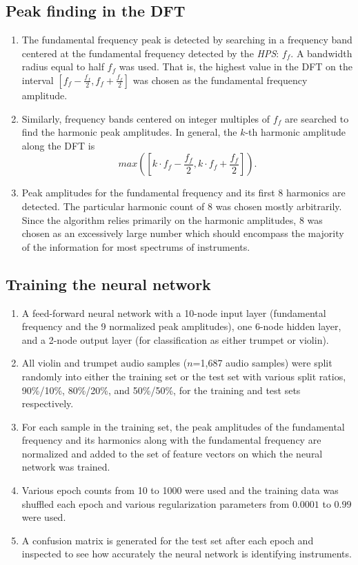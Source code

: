 \documentclass[12pt]{article}
\begin{document}
\subsection{Peak finding in the DFT}
\begin{enumerate}
	\item The fundamental frequency peak is detected by searching in a frequency band centered at the fundamental frequency detected by the \textit{HPS}: $f_{f}$. A bandwidth radius equal to half $f_{f}$ was used. That is, the highest value in the DFT on the interval $[f_{f} - \frac{f_{f}}{2}, f_{f} + \frac{f_{f}}{2}]$ was chosen as the fundamental frequency amplitude.
	\item Similarly, frequency bands centered on integer multiples of $f_{f}$ are searched to find the harmonic peak amplitudes. In general, the $k$-th harmonic amplitude along the DFT is
	$$max([k\cdot f_{f} - \frac{f_{f}}{2}, k\cdot f_{f} + \frac{f_{f}}{2}]).$$
	\item Peak amplitudes for the fundamental frequency and its first 8 harmonics are detected. The particular harmonic count of 8 was chosen mostly arbitrarily. Since the algorithm relies primarily on the harmonic amplitudes, 8 was chosen as an excessively large number which should encompass the majority of the information for most spectrums of instruments.
\end{enumerate}	
	
\subsection{Training the neural network}
\begin{enumerate}
	\item A feed-forward neural network with a 10-node input layer (fundamental frequency and the 9 normalized peak amplitudes), one 6-node hidden layer, and a 2-node output layer (for classification as either trumpet or violin).
	\item All violin and trumpet audio samples ($n$=1,687 audio samples) were split randomly into either the training set or the test set with various split ratios, 90\%/10\%, 80\%/20\%, and 50\%/50\%, for the training and test sets respectively.
	\item For each sample in the training set, the peak amplitudes of the fundamental frequency and its harmonics along with the fundamental frequency are normalized and added to the set of feature vectors on which the neural network was trained.
	\item Various epoch counts from 10 to 1000 were used and the training data was shuffled each epoch and various regularization parameters from $0.0001$ to $0.99$ were used.
	\item A confusion matrix is generated for the test set after each epoch and inspected to see how accurately the neural network is identifying instruments.
\end{enumerate}
\end{document}
